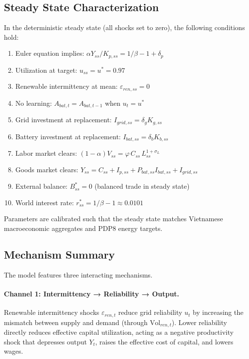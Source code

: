 \documentclass[12pt, a4paper]{article}
\begin{document}
\subsection{Steady State Characterization}

In the deterministic steady state (all shocks set to zero), the following conditions hold:

\begin{enumerate}
    \item Euler equation implies: $\alpha Y_{ss}/K_{p,ss} = 1/\beta - 1 + \delta_p$
    \item Utilization at target: $u_{ss} = u^* = 0.97$
    \item Renewable intermittency at mean: $\varepsilon_{ren,ss} = 0$
    \item No learning: $A_{bat,t} = A_{bat,t-1}$ when $u_t = u^*$
    \item Grid investment at replacement: $I_{grid,ss} = \delta_g K_{g,ss}$
    \item Battery investment at replacement: $I_{bat,ss} = \delta_b K_{b,ss}$
    \item Labor market clears: $(1-\alpha)V_{ss} = \varphi \, C_{ss} \, L_{ss}^{1+\sigma_L}$
    \item Goods market clears: $Y_{ss} = C_{ss} + I_{p,ss} + P_{bat,ss} I_{bat,ss} + I_{grid,ss}$
    \item External balance: $B^*_{ss} = 0$ (balanced trade in steady state)
    \item World interest rate: $r^*_{ss} = 1/\beta - 1 \approx 0.0101$
\end{enumerate}

Parameters are calibrated such that the steady state matches Vietnamese macroeconomic aggregates and PDP8 energy targets.

\subsection{Mechanism Summary}

The model features three interacting mechanisms.

\paragraph{Channel 1: Intermittency → Reliability → Output.}
Renewable intermittency shocks $\varepsilon_{ren,t}$ reduce grid reliability $u_t$ by increasing the mismatch between supply and demand (through $\text{Vol}_{ren,t}$). Lower reliability directly reduces effective capital utilization, acting as a negative productivity shock that depresses output $Y_t$, raises the effective cost of capital, and lowers wages.
\end{document}
